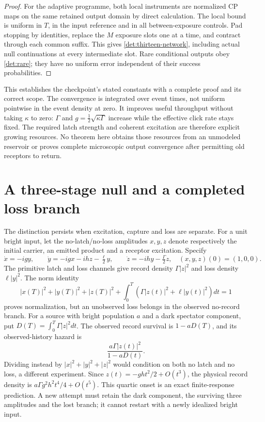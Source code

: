\documentclass[11pt,oneside,openany]{book}
\theoremstyle{definition}
\theoremstyle{remark}\newtheorem{remark}[theorem]{Remark}
\begin{document}
\begin{proof}
For the adaptive programme, both local instruments are normalized CP
maps on the same retained output domain by direct calculation. The
local bound is uniform in $T$, in the input reference and in all
between-exposure controls. Pad stopping by identities, replace the
$M$ exposure slots one at a time, and contract through each common
suffix. This gives \eqref{det:thirteen-network}, including actual
null continuations at every intermediate slot. Rare conditional
outputs obey \eqref{det:rare}; they have no uniform error independent
of their success probabilities.
\end{proof}

This establishes the checkpoint's stated constants with a complete
proof and its correct scope. The convergence is integrated over
event times, not uniform pointwise in the event density at zero.
It improves useful throughput without taking $\kappa$ to zero:
$\Gamma$ and $g=\tfrac12\sqrt{\kappa\Gamma}$ increase while the
effective click rate stays fixed. The required latch strength and
coherent excitation are therefore explicit growing resources. No
theorem here obtains those resources from an unmodeled reservoir or
proves complete microscopic output convergence after permitting old
receptors to return.

\section{A three-stage null and a completed loss branch}

The distinction persists when excitation, capture and loss are
separate. For a unit bright input, let the no-latch/no-loss amplitudes
$x,y,z$ denote respectively the initial carrier, an emitted product
and a receptor excitation. Specify
\begin{equation}
 \dot x=-igy,\qquad
 \dot y=-igx-ihz-\tfrac\ell2y,\qquad
 \dot z=-ihy-\tfrac\Gamma2z,
 \quad(x,y,z)(0)=(1,0,0).                       \label{det:three-stage}
\end{equation}
The primitive latch and loss channels give record density
$\Gamma|z|^2$ and loss density $\ell|y|^2$. The norm identity
\[
 |x(T)|^2+|y(T)|^2+|z(T)|^2+
 \int_0^T(\Gamma|z(t)|^2+\ell|y(t)|^2)dt=1
\]
proves normalization, but an unobserved loss belongs in the observed
no-record branch. For a source with bright population $a$ and a
dark spectator component, put $D(T)=\int_0^T\Gamma|z|^2dt$.
The observed record survival is $1-aD(T)$, and its observed-history
hazard is
\[
 \frac{a\Gamma|z(t)|^2}{1-aD(t)}.
\]
Dividing instead by $|x|^2+|y|^2+|z|^2$ would condition on both no
latch and no loss, a different experiment. Since
$z(t)=-gh t^2/2+O(t^3)$, the physical record density is
$a\Gamma g^2h^2t^4/4+O(t^5)$. This quartic onset is an exact
finite-response prediction. A new attempt must retain the dark
component, the surviving three amplitudes and the lost branch; it
cannot restart with a newly idealized bright input.
\end{document}
